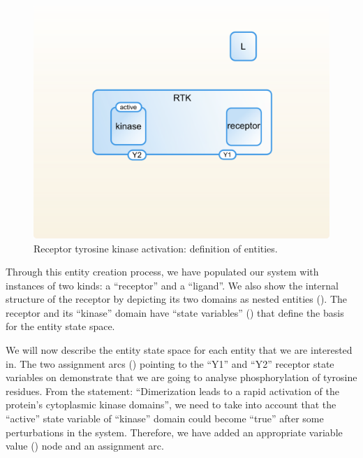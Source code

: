 \begin{figure}[H]
  \centering
  \vspace*{-0.75em}
  \includegraphics[scale=0.75]{examples/rtk-entities.png}
   \caption{Receptor tyrosine kinase activation: definition of entities.}
  \label{fig:rtk-entities}
\end{figure}

Through this entity creation process, we have populated our system with instances of two kinds: a ``receptor'' and a ``ligand''. We also show the internal structure of the receptor by depicting its two domains as nested entities (). The receptor and its ``kinase'' domain have ``state variables'' () that define the basis for the entity state space.

We will now describe the entity state space for each entity that we are interested in. The two assignment arcs () pointing to the ``Y1'' and ``Y2'' receptor state variables on  demonstrate that we are going to analyse phosphorylation of tyrosine residues. From the statement: ``Dimerization leads to a rapid activation of the protein's cytoplasmic kinase domains'', we need to take into account that the ``active'' state variable of ``kinase'' domain could become ``true'' after some perturbations in the system. Therefore, we have added an appropriate variable value () node and an assignment arc.

